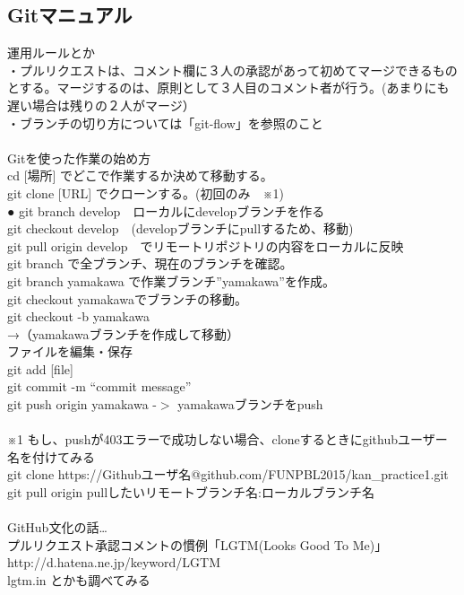 \documentclass[openany,11pt,papersize]{jsbook}
\begin{document}
\begin{appendix}
\section{Gitマニュアル}
運用ルールとか \\
・プルリクエストは、コメント欄に３人の承認があって初めてマージできるものとする。マージするのは、原則として３人目のコメント者が行う。(あまりにも遅い場合は残りの２人がマージ）\\
・ブランチの切り方については「git-flow」を参照のこと \\ \\
Gitを使った作業の始め方 \\
cd [場所] でどこで作業するか決めて移動する。 \\
git clone [URL] でクローンする。(初回のみ　※1) \\
      ● git branch develop　ローカルにdevelopブランチを作る \\
git checkout develop　(developブランチにpullするため、移動) \\
git pull origin develop　でリモートリポジトリの内容をローカルに反映 \\
git branch で全ブランチ、現在のブランチを確認。 \\
git branch yamakawa で作業ブランチ”yamakawa”を作成。 \\
git checkout yamakawaでブランチの移動。 \\
	git checkout -b yamakawa \\
→（yamakawaブランチを作成して移動）\\
 ファイルを編集・保存 \\
git add [file] \\
git commit -m “commit message” \\
git push origin yamakawa  -$>$  yamakawaブランチをpush \\ \\
※1
もし、pushが403エラーで成功しない場合、cloneするときにgithubユーザー名を付けてみる \\
git clone https://Githubユーザ名@github.com/FUNPBL2015/kan\_practice1.git \\
git pull origin pullしたいリモートブランチ名:ローカルブランチ名 \\ \\
GitHub文化の話… \\
プルリクエスト承認コメントの慣例「LGTM(Looks Good To Me)」 \\
http://d.hatena.ne.jp/keyword/LGTM \\
lgtm.in とかも調べてみる \\ \\

\end{appendix}
\end{document}
